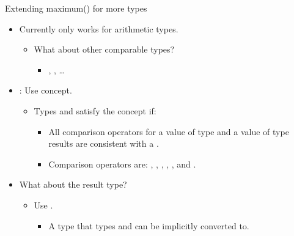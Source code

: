 \begin{frame}[t,fragile]{Extending maximum() for more types}
\begin{itemize}
  \item Currently  only works for arithmetic types.
    \begin{itemize}
      \item What about other comparable types?
        \begin{itemize}
          \item {}, , \ldots
        \end{itemize}
    \end{itemize}

  \item {}: Use  concept.
    \begin{itemize}
      \item Types  and  satisfy the  concept
            if:
        \begin{itemize}
          \item All comparison operators for a value  of type  and
                a value  of type  results are consistent 
                with a .
          \item Comparison operators are:
                \cppkey{==}, \cppkey{!=}, \cppkey{<}, \cppkey{<=}, \cppkey{>}, and \cppkey{>=}.
        \end{itemize}
    \end{itemize}

  \item What about the result type?
    \begin{itemize}
      \item Use .
        \begin{itemize}
          \item A type  that types  and  can be implicitly converted to.
        \end{itemize}
    \end{itemize}

\end{itemize}
\end{frame}

